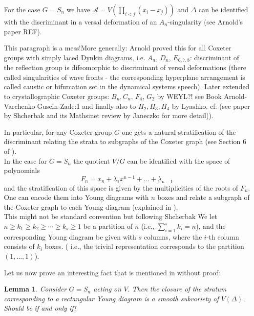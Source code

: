 \documentclass[letter,11pt]{amsart}
\newcommand{\ef}[1]{{\color{Cerulean} #1}}
\theoremstyle{theorem}
\newtheorem{lem}[Thm]{Lemma}
\theoremstyle{remark}
\theoremstyle{definition}
\begin{document}
For the case $G=S_n$ we have $\mathcal{A}=V(\prod_{i < j}(x_i - x_j))$ and $\Delta$ can be identified with the discriminant in a versal deformation of an $A_n$-singularity (see Arnold's paper REF). 

\ef{This paragraph is a mess!}More generally: Arnold proved this for all Coxeter groups with simply laced Dynkin diagrams, i.e. $A_n$, $D_n$, $E_{6,7,8}$: discriminant of the reflection group is difeomorphic to discriminant of versal deformations (there called singularities of wave fronts - the corresponding hyperplane arrangement is called caustic or bifurcation set in the dynamical systems speech). Later extended to crystallographic Coxeter groups: $B_n, C_n$, $F_4$, $G_2$ by WEYL?! see Book Arnold-Varchenko-Gusein-Zade:1 and finally also to $H_2, H_3, H_4$ by Lyashko, cf. \cite{Lyashko79, Lyashko84} (see paper by Shcherbak and its Mathsinet review by Janeczko for more detail)).

In particular, for any Coxeter group $G$ one gets a natural stratification of the discriminant relating the strata to subgraphs of the Coxeter graph (see Section 6 of \cite{Shcherbak}). \\
In the case for $G=S_n$ the quotient $V/G$ can be identified with the space of polynomials 
$$F_n=x_{n}+\lambda_1x^{n-1} + \ldots + \lambda_{n-1}$$
and the stratification of this space is given by the multiplicities of the roots of $F_n$. One can encode them into Young diagrams with $n$ boxes and relate a subgraph of the Coxeter graph to each Young diagram (explained in \cite[p.185]{Shcherbak}). \\

\ef{This might not be standard convention but following Shcherbak} We let $n \geq k_1 \geq k_2 \geq \cdots \geq k_s \geq 1$ be a partition of $n$ (i.e., $\sum_{i=1}^sk_i=n$), and the corresponding Young diagram be given with $s$ columns, where the $i$-th column consists of  $k_i$ boxes. (\ef{i.e., the trivial representation corresponds to the partition $(1, \ldots, 1)$}).

Let us now prove an interesting fact that is mentioned in \cite[p.185]{Shcherbak} without proof:


\begin{lem}  \label{Lem:rectangular}
Consider $G=S_n$ acting on $V$. Then the closure of the stratum corresponding to a rectangular Young diagram is a smooth subvariety of $V(\Delta)$. \ef{Should be if and only if!}
\end{lem}
\end{document}
